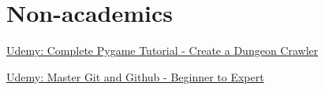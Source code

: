 \documentclass[]{deedy-resume-openfont}
\begin{document}
\begin{minipage}[t]{0.66\textwidth}

\section{Non-academics}
\begin{tightemize} 
\item \href{https://www.udemy.com/course/pygame-dungeon-crawler/?referralCode=C1B3B7636B26BC1A7F1B&couponCode=ST15MT31224}{Udemy: Complete Pygame Tutorial - Create a Dungeon Crawler}
\item \href{https://www.udemy.com/certificate/UC-b3157d51-19c3-4510-a924-2206bc5a0903/}{Udemy: Master Git and Github - Beginner to Expert}
\end{tightemize}
\sectionsep



%
% 
% 

\end{minipage} 
\end{document}
